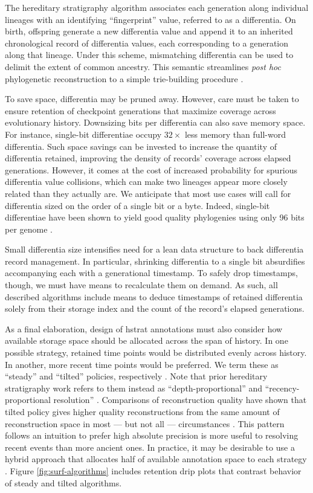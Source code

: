 The hereditary stratigraphy algorithm associates each generation along individual lineages with an identifying ``fingerprint'' value, referred to as a differentia.
On birth, offspring generate a new differentia value and append it to an inherited chronological record of differentia values, each corresponding to a generation along that lineage.
Under this scheme, mismatching differentia can be used to delimit the extent of common ancestry.
This semantic streamlines \textit{post hoc} phylogenetic reconstruction to a simple trie-building procedure
\citep{moreno2024analysis}.

To save space, differentia may be pruned away.
However, care must be taken to ensure retention of checkpoint generations that maximize coverage across evolutionary history.
Downsizing bits per differentia can also save memory space.
For instance, single-bit differentiae occupy $32\times$ less memory than full-word differentia.
Such space savings can be invested to increase the quantity of differentia retained, improving the density of records' coverage across elapsed generations.
However, it comes at the cost of increased probability for spurious differentia value collisions, which can make two lineages appear more closely related than they actually are.
We anticipate that most use cases will call for differentia sized on the order of a single bit or a byte.
Indeed, single-bit differentiae have been shown to yield good quality phylogenies using only 96 bits per genome \citep{TODOOTHERPAPER}.

Small differentia size intensifies need for a lean data structure to back differentia record management.
In particular, shrinking differentia to a single bit absurdifies accompanying each with a generational timestamp.
To safely drop timestamps, though, we must have means to recalculate them on demand.
As such, all described algorithms include means to deduce timestamps of retained differentia solely from their storage index and the count of the record's elapsed generations.

As a final elaboration, design of hstrat annotations must also consider how available storage space should be allocated across the span of history.
In one possible strategy, retained time points would be distributed evenly across history.
In another, more recent time points would be preferred.
We term these as ``steady'' and ``tilted'' policies, respectively \citep{han2005stream,zhao2005generalized}.
Note that prior hereditary stratigraphy work refers to them instead as ``depth-proportional'' and ``recency-proportional resolution'' \citep{moreno2022hereditary}.
Comparisons of reconstruction quality have shown that tilted policy gives higher quality reconstructions from the same amount of reconstruction space in most --- but not all --- circumstances \citep{TODOOTHERPAPER}.
This pattern follows an intuition to prefer high absolute precision is more useful to resolving recent events than more ancient ones.
In practice, it may be desirable to use a hybrid approach that allocates half of available annotation space to each strategy \citep{TODOOTHERPAPER}.
Figure \ref{fig:surf-algorithms} includes retention drip plots that contrast behavior of steady and tilted algorithms.

